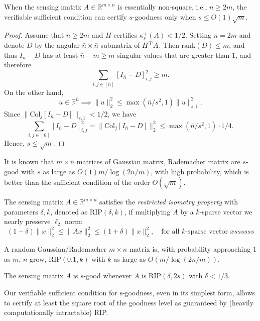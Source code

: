 \begin{proposition}
When the sensing matrix $A\in\mathbb{R}^{m\times n}$ is essentially non-square, i.e., $n\ge 2m$, the verifiable sufficient condition can certify $s$-goodness only when $s\le O(1)\sqrt{m}$.
\end{proposition}
\begin{proof}
Assume that $n\ge 2m$ and $H$ certifies $\kappa_s^+(A)<1/2$.
Setting $\bar{n}=2m$ and denote $D$ by the angular $\bar{n}\times\bar{n}$ submatrix of $H^{\mathrm T} A$.
Then $\text{rank}(D)\le m$, and thus $I_{\bar{n}}-D$ has at least $\bar{n}-m\ge m$ singular values that are greater than $1$, and therefore
\[
\sum_{i,j\in[\bar{n}]}[I_{\bar{n}}-D]_{i,j}^2\ge m.
\]
On the other hand, 
\[
u\in \mathbb{R}^{\bar{n}}\implies
\|u\|_2^2\le \max(\bar{n}/s^2,1)\|u\|_{s,1}^2.
\]
Since $\|\text{Col}_j[I_{\bar{n}}-D]\|_{s,1}<1/2$, we have
\[
\sum_{i,j\in[\bar{n}]}[I_{\bar{n}}-D]_{i,j}^2
=
\|\text{Col}_j[I_{\bar{n}}-D]\|_2^2\le \max(\bar{n}/s^2,1)\cdot1/4.
\]
Hence, $s\le \sqrt{m}$.
\end{proof}

\begin{remark}
It is known that $m\times n$ matrices of Gaussian matrix, Rademacher matrix are $s$-good with $s$ as large as $O(1)m/\log(2n/m)$, with high probability, which is better than the sufficient condition of the order $O(\sqrt{m}).$
\end{remark}

\begin{definition}
The sensing matrix $A\in\mathbb{R}^{m\times n}$ satisfies the \emph{restricted isometry property} with parameters $\delta,k$, denoted as $\text{RIP}(\delta,k)$, if multiplying $A$ by a $k$-sparse vector we nearly preserve $\ell_2$ norm:
\[
(1-\delta)\|x\|_2^2\le \|Ax\|_2^2\le (1+\delta)\|x\|_2^2,\quad \text{for all $k$-sparse vector $x$}ssssss
\]
\end{definition}

\begin{proposition}
A random Gaussian/Rademacher $m\times n$ matrix is, with probability approaching 1 as
$m$, $n$ grow, $\text{RIP}(0.1,k)$ with $k$ as large as $O(m/\log(2n/m))$.
\end{proposition}
\begin{proposition}
The sensing matrix $A$ is $s$-good whenever $A$ is $\text{RIP}(\delta,2s)$ with $\delta<1/3$.
\end{proposition}

\begin{remark}
Our verifiable sufficient condition for s-goodness, even in its simplest form, allows
to certify at least the square root of the goodness level as guaranteed by (heavily
computationally intractable) RIP.
\end{remark}












